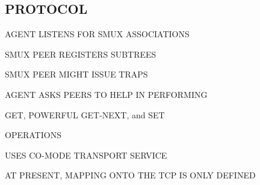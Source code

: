 

\begin{bwslide}
\part*	{PROTOCOL}\bf

\begin{nrtc}
\item	AGENT LISTENS FOR SMUX ASSOCIATIONS

\item	SMUX PEER REGISTERS SUBTREES

\item	SMUX PEER MIGHT ISSUE TRAPS

\item	AGENT ASKS PEERS TO HELP IN PERFORMING
    \begin{nrtc}
    \item	GET, POWERFUL GET-NEXT, and SET
    \end{nrtc}
    OPERATIONS

\item	USES CO-MODE TRANSPORT SERVICE
    \begin{nrtc}
    \item	AT PRESENT, MAPPING ONTO THE TCP IS ONLY DEFINED
    \end{nrtc}
\end{nrtc}
\end{bwslide}






